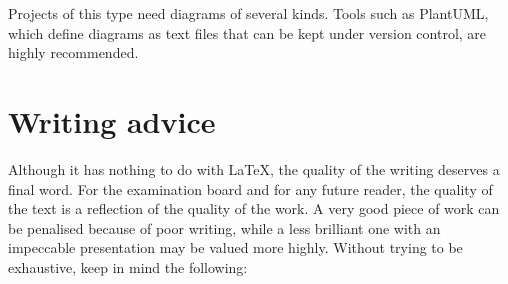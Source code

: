 Projects of this type need diagrams of several kinds. Tools such as PlantUML, which define
diagrams as text files that can be kept under version control, are highly recommended.

\section{Writing advice}\label{sec:writing-advice}

Although it has nothing to do with \LaTeX{}, the quality of the writing deserves a final
word. For the examination board and for any future reader, the quality of the text is a
reflection of the quality of the work. A very good piece of work can be penalised because of
poor writing, while a less brilliant one with an impeccable presentation may be valued more
highly. Without trying to be exhaustive, keep in mind the following:

